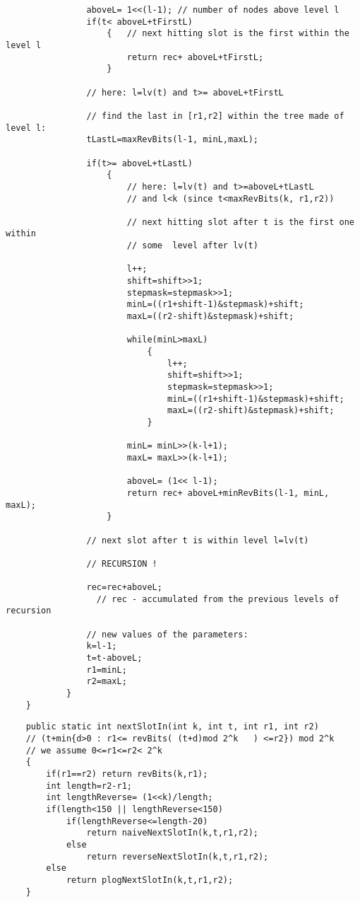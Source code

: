 \documentclass{letter}
\begin{document}
\begin{verbatim}
                aboveL= 1<<(l-1); // number of nodes above level l
                if(t< aboveL+tFirstL)
                    {   // next hitting slot is the first within the level l
                        return rec+ aboveL+tFirstL; 
                    }

                // here: l=lv(t) and t>= aboveL+tFirstL

                // find the last in [r1,r2] within the tree made of level l: 
                tLastL=maxRevBits(l-1, minL,maxL); 

                if(t>= aboveL+tLastL)
                    {
                        // here: l=lv(t) and t>=aboveL+tLastL 
                        // and l<k (since t<maxRevBits(k, r1,r2))

                        // next hitting slot after t is the first one within 
                        // some  level after lv(t)

                        l++;
                        shift=shift>>1;
                        stepmask=stepmask>>1;
                        minL=((r1+shift-1)&stepmask)+shift;
                        maxL=((r2-shift)&stepmask)+shift;

                        while(minL>maxL)
                            {
                                l++;
                                shift=shift>>1;
                                stepmask=stepmask>>1;
                                minL=((r1+shift-1)&stepmask)+shift;
                                maxL=((r2-shift)&stepmask)+shift;
                            }

                        minL= minL>>(k-l+1);
                        maxL= maxL>>(k-l+1);

                        aboveL= (1<< l-1);
                        return rec+ aboveL+minRevBits(l-1, minL, maxL);
                    }
        
                // next slot after t is within level l=lv(t)
 
                // RECURSION !

                rec=rec+aboveL; 
                  // rec - accumulated from the previous levels of recursion

                // new values of the parameters:
                k=l-1;
                t=t-aboveL;
                r1=minL;
                r2=maxL;
            }
    }
\end{verbatim}

\begin{verbatim}
    public static int nextSlotIn(int k, int t, int r1, int r2)
    // (t+min{d>0 : r1<= revBits( (t+d)mod 2^k   ) <=r2}) mod 2^k 
    // we assume 0<=r1<=r2< 2^k 
    {
        if(r1==r2) return revBits(k,r1);
        int length=r2-r1;
        int lengthReverse= (1<<k)/length;
        if(length<150 || lengthReverse<150)
            if(lengthReverse<=length-20)
                return naiveNextSlotIn(k,t,r1,r2);
            else
                return reverseNextSlotIn(k,t,r1,r2);
        else
            return plogNextSlotIn(k,t,r1,r2);
    }
\end{verbatim}
\end{document}
